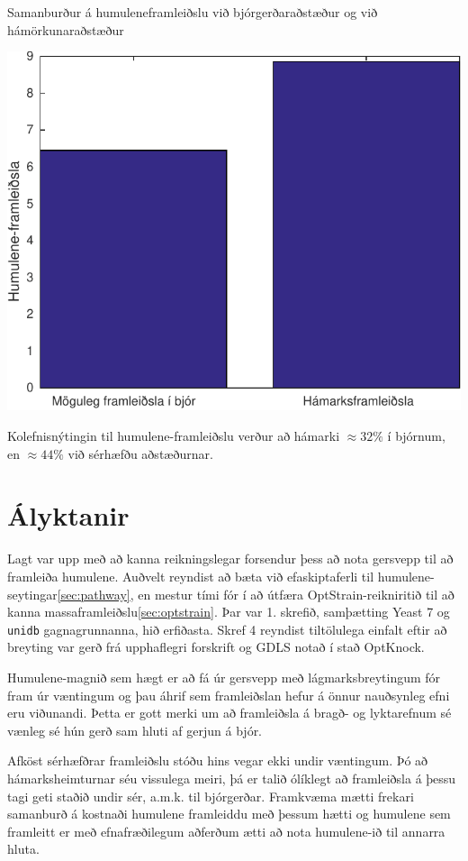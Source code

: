 \documentclass[11pt]{article}
\makeatletter
\newenvironment{figureonecolumn}{\begin{minipage}{\linewidth}\begin{center}\def\@captype{figure}}{\end{center}\end{minipage}}
\makeatother
\begin{document}
\begin{multicols}{2}
\begin{figureonecolumn}
\caption{Samanburður á humuleneframleiðslu við bjórgerðaraðstæður og við hámörkunaraðstæður}
\label{fig:comparative}
\includegraphics[width=\linewidth]{Pics/ComparativeProduction}
\end{figureonecolumn}

Kolefnisnýtingin til humulene-framleiðslu verður að hámarki $\approx32\%$ í bjórnum, en $\approx44\%$ við sérhæfðu aðstæðurnar.

\section{Ályktanir}
Lagt var upp með að kanna reikningslegar forsendur þess að nota gersvepp til að framleiða humulene. Auðvelt reyndist að bæta við efaskiptaferli til humulene-seytingar\ref{sec:pathway}, en mestur tími fór í að útfæra OptStrain-reikniritið til að kanna massaframleiðslu\ref{sec:optstrain}. Þar var 1. skrefið, samþætting Yeast 7 og \texttt{unidb} gagnagrunnanna, hið erfiðasta. Skref 4 reyndist tiltölulega einfalt eftir að breyting var gerð frá upphaflegri forskrift og GDLS notað í stað OptKnock.

Humulene-magnið sem hægt er að fá úr gersvepp með lágmarksbreytingum fór fram úr væntingum og þau áhrif sem framleiðslan hefur á önnur nauðsynleg efni eru viðunandi. Þetta er gott merki um að framleiðsla á bragð- og lyktarefnum sé vænleg sé hún gerð sam hluti af gerjun á bjór.

Afköst sérhæfðrar framleiðslu stóðu hins vegar ekki undir væntingum. Þó að hámarksheimturnar séu vissulega meiri, þá er talið ólíklegt að framleiðsla á þessu tagi geti staðið undir sér, a.m.k. til bjórgerðar. Framkvæma mætti frekari samanburð á kostnaði humulene framleiddu með þessum hætti og humulene sem framleitt er með efnafræðilegum aðferðum \cite{corey1967total,mcmurry1982stereospecific} ætti að nota humulene-ið til annarra hluta. 


\end{multicols}
\end{document}
